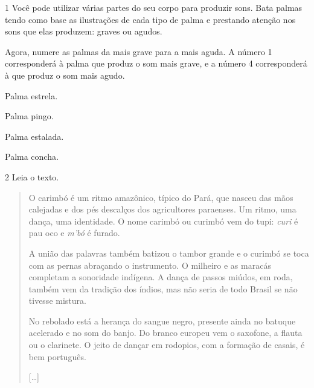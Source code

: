 
\num{1} Você pode utilizar várias partes do seu corpo para produzir sons.
Bata palmas tendo como base as ilustrações de cada tipo de palma e
prestando atenção nos sons que elas produzem: graves ou agudos.


Agora, numere as palmas da mais grave para a mais aguda. A número 1
corresponderá à palma que produz o som mais grave, e a número 4 corresponderá à que
produz o som mais agudo.

\begin{boxlist}
 Palma estrela.

 Palma pingo.

 Palma estalada.

 Palma concha.
\end{boxlist}


\num{2}  Leia o texto.

\begin{quote}
O carimbó é um ritmo amazônico, típico do Pará, que nasceu das mãos
calejadas e dos pés descalços dos agricultores paraenses. Um ritmo, uma
dança, uma identidade. O nome carimbó ou curimbó vem do tupi:
\emph{curi} é pau oco e \emph{m'bó} é furado.

A união das palavras também batizou o tambor grande e o curimbó se toca
com as pernas abraçando o instrumento. O milheiro e as maracás completam
a sonoridade indígena. A dança de passos miúdos, em roda, também vem da
tradição dos índios, mas não seria de todo Brasil se não tivesse
mistura.

No rebolado está a herança do sangue negro, presente ainda no batuque
acelerado e no som do banjo. Do branco europeu vem o saxofone, a flauta
ou o clarinete. O jeito de dançar em rodopios, com a formação de casais,
é bem português.

{[}\ldots{}{]}

\end{quote}

